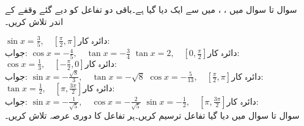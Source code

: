 سوال  تا سوال  میں ، ،  میں سے ایک دیا گیا ہے۔باقی دو تفاعل کو دیے گئے وقفے کے اندر تلاش کریں۔

$\sin x=\tfrac{3}{5},\quad  [\tfrac{\pi}{2},\pi]\text{دائرہ کار:}$\\
جواب:\quad
$\cos x=-\tfrac{4}{5},\quad \tan x=-\tfrac{3}{4}$
$\tan x=2,\quad  [0,\tfrac{\pi}{2}]\text{دائرہ کار:}$
$\cos x=\tfrac{1}{3},\quad  [-\tfrac{\pi}{2},0]\text{دائرہ کار:}$\\
جواب:\quad
$\sin x=-\tfrac{\sqrt{8}}{3},\quad \tan x=-\sqrt{8}$
$\cos x=-\tfrac{5}{13},\quad  [\tfrac{\pi}{2},\pi]\text{دائرہ کار:}$
$\tan x=\tfrac{1}{2},\quad  [\pi,\tfrac{3\pi}{2}]\text{دائرہ کار:}$\\
جواب:\quad
$\sin x=-\tfrac{1}{\sqrt{5}},\quad \cos x=-\tfrac{2}{\sqrt{5}}$
$\sin x=-\tfrac{1}{2},\quad  [\pi,\tfrac{3\pi}{2}]\text{دائرہ کار:}$
\\
سوال  تا سوال  میں دیا گیا تفاعل ترسیم کریں۔ہر تفاعل کا دوری عرصہ تلاش کریں۔

